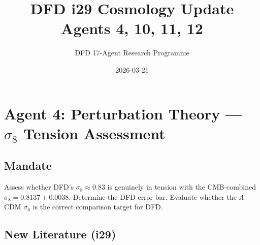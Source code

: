 \documentclass[11pt,a4paper]{article}
\title{DFD i29 Cosmology Update\\Agents 4, 10, 11, 12}
\author{DFD 17-Agent Research Programme}
\date{2026-03-21}
\begin{document}
\maketitle
\tableofcontents
\newpage

\section{Agent 4: Perturbation Theory --- $\sigma_8$ Tension Assessment}

\subsection{Mandate}
Assess whether DFD's $\sigma_8 \approx 0.83$ is genuinely in tension with the CMB-combined $\sigma_8 = 0.8137 \pm 0.0038$. Determine the DFD error bar. Evaluate whether the $\Lambda$CDM $\sigma_8$ is the correct comparison target for DFD.

\subsection{New Literature (i29)}
\end{document}
